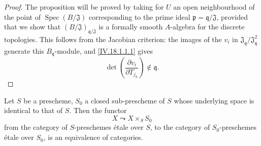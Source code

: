 \begin{proof}
The proposition will be proved by taking for $U$ an open neighbourhood of the point of $\operatorname{Spec}(B/\mathfrak{J})$ corresponding to the prime ideal $\mathfrak p=\mathfrak q/\mathfrak{J}$, provided that we show that $(B/\mathfrak{J})_{\mathfrak q/\mathfrak{J}}$ is a formally smooth $A$-algebra for the discrete topologies.  This follows from the Jacobian criterion: the images of the $v_i$ in $\mathfrak{J}_{\mathfrak q}/\mathfrak{J}_{\mathfrak q}^2$ generate this $B_{\mathfrak q}$-module, and \eqref{IV.18.1.1.1} gives
\[
 \det\left(\frac{\partial v_i}{\partial T_{j_h}}\right)\notin\mathfrak q.
\]
\end{proof}

\begin{theorem}[18.1.2]
\label{IV.18.1.2}
Let $S$ be a prescheme, $S_0$ a closed sub-prescheme of $S$ whose underlying space is identical to that of $S$.
Then the functor
\[
X\leadsto X\times_S S_0
\]
from the category of $S$-preschemes \'etale over $S$, to the category of $S_0$-preschemes \'etale over $S_0$, is an equivalence of categories.
\end{theorem}

